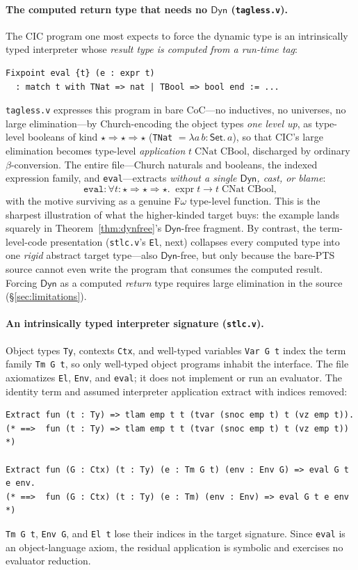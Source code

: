 \documentclass[acmsmall,anonymous=false,nonacm]{acmart}
\newcommand{\dyn}{\ensuremath{\mathsf{Dyn}}}
\newcommand{\kstar}{\ensuremath{\star}}
\newcommand{\karr}{\ensuremath{\Rightarrow}}
\newcommand{\Set}{\ensuremath{\mathsf{Set}}}
\begin{document}
\paragraph{The computed return type that needs no $\dyn$ (\texttt{tagless.v}).}
The CIC program one most expects to force the dynamic type is an
intrinsically typed interpreter whose \emph{result type is computed from a
run-time tag}:
\begin{lstlisting}
Fixpoint eval {t} (e : expr t)
  : match t with TNat => nat | TBool => bool end := ...
\end{lstlisting}
\texttt{tagless.v} expresses this program in bare CoC---no inductives, no
universes, no large elimination---by Church-encoding the object types
\emph{one level up}, as type-level booleans of kind $\kstar \karr \kstar
\karr \kstar$ (\texttt{TNat} $= \lambda a\,b{:}\Set.\,a$), so that CIC's
large elimination becomes type-level \emph{application}
$t\;\mathrm{CNat}\;\mathrm{CBool}$, discharged by ordinary
$\beta$-conversion. The entire file---Church naturals and booleans, the
indexed expression family, and \texttt{eval}---extracts \emph{without a
single $\dyn$, cast, or blame}:
\[
\texttt{eval} : \forall t{:}\kstar{\karr}\kstar{\karr}\kstar.\;\;
\mathrm{expr}\;t \to t\;\mathrm{CNat}\;\mathrm{CBool},
\]
with the motive surviving as a genuine F$\omega$ type-level function. This
is the sharpest illustration of what the higher-kinded target buys: the
example lands squarely in Theorem~\ref{thm:dynfree}'s $\dyn$-free fragment.
By contrast, the term-level-code presentation (\texttt{stlc.v}'s
\texttt{El}, next) collapses every computed type into one \emph{rigid}
abstract target type---also $\dyn$-free, but only because the bare-PTS
source cannot even write the program that consumes the computed result.
Forcing $\dyn$ as a computed \emph{return} type requires large elimination
in the source (\S\ref{sec:limitations}).

\paragraph{An intrinsically typed interpreter signature (\texttt{stlc.v}).}
Object types \texttt{Ty}, contexts \texttt{Ctx}, and well-typed variables
\texttt{Var G t} index the term family \texttt{Tm G t}, so only well-typed object
programs inhabit the interface. The file axiomatizes \texttt{El}, \texttt{Env},
and \texttt{eval}; it does not implement or run an evaluator. The identity term
and assumed interpreter application extract with indices removed:
\begin{lstlisting}
Extract fun (t : Ty) => tlam emp t t (tvar (snoc emp t) t (vz emp t)).
(* ==>  fun (t : Ty) => tlam emp t t (tvar (snoc emp t) t (vz emp t)) *)

Extract fun (G : Ctx) (t : Ty) (e : Tm G t) (env : Env G) => eval G t e env.
(* ==>  fun (G : Ctx) (t : Ty) (e : Tm) (env : Env) => eval G t e env *)
\end{lstlisting}
\texttt{Tm G t}, \texttt{Env G}, and \texttt{El t} lose their indices in the
target signature. Since \texttt{eval} is an object-language axiom, the residual
application is symbolic and exercises no evaluator reduction.
\end{document}
